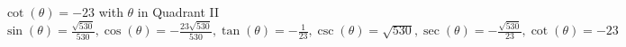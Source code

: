 {$\cot(\theta) = -23$ with $\theta$ in Quadrant II }
{$\sin(\theta) = \frac{\sqrt{530}}{530}, \cos(\theta) = -\frac{23\sqrt{530}}{530}, \tan(\theta) = -\frac{1}{23}, \csc(\theta) = \sqrt{530}, \sec(\theta) = -\frac{\sqrt{530}}{23}, \cot(\theta) = -23$}